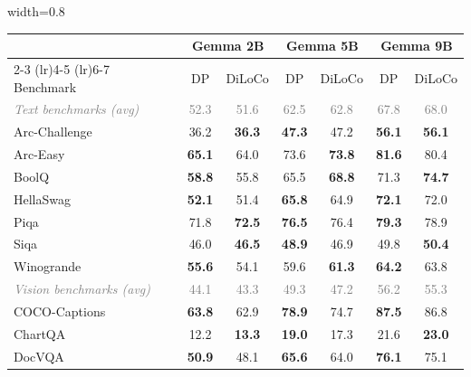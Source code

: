 \documentclass[11pt, a4paper, twocolumn, copyright, google]{google}
\begin{document}
\begin{table}[!ht]
    \centering
    \begin{adjustbox}{width=0.8\textwidth} %
    \begin{tabular}{l cc cc cc}
        \toprule
        & \multicolumn{2}{c}{Gemma 2B} & \multicolumn{2}{c}{Gemma 5B} & \multicolumn{2}{c}{Gemma 9B} \\
        \cmidrule(lr){2-3} \cmidrule(lr){4-5} \cmidrule(lr){6-7}
        Benchmark & DP & DiLoCo & DP & DiLoCo & DP & DiLoCo \\
        \midrule
        \textcolor{gray}{\small\textit{Text benchmarks (avg)}} & \textcolor{gray}{\small 52.3} & \textcolor{gray}{\small 51.6} & \textcolor{gray}{\small 62.5} & \textcolor{gray}{\small 62.8} & \textcolor{gray}{\small 67.8} & \textcolor{gray}{\small 68.0} \\
        Arc-Challenge   & 36.2 & \textbf{36.3} & \textbf{47.3} & 47.2 & \textbf{56.1} & \textbf{56.1} \\
        Arc-Easy        & \textbf{65.1} & 64.0 & 73.6 & \textbf{73.8} & \textbf{81.6} & 80.4 \\
        BoolQ           & \textbf{58.8} & 55.8 & 65.5 & \textbf{68.8} & 71.3 & \textbf{74.7} \\
        HellaSwag       & \textbf{52.1} & 51.4 & \textbf{65.8} & 64.9 & \textbf{72.1} & 72.0 \\
        Piqa            & 71.8 & \textbf{72.5} & \textbf{76.5} & 76.4 & \textbf{79.3} & 78.9 \\
        Siqa            & 46.0 & \textbf{46.5} & \textbf{48.9} & 46.9 & 49.8 & \textbf{50.4} \\
        Winogrande      & \textbf{55.6} & 54.1 & 59.6 & \textbf{61.3} & \textbf{64.2} & 63.8 \\
        \midrule
        \textcolor{gray}{\small\textit{Vision benchmarks (avg)}} & \textcolor{gray}{\small 44.1} & \textcolor{gray}{\small 43.3} & \textcolor{gray}{\small 49.3} & \textcolor{gray}{\small 47.2} & \textcolor{gray}{\small 56.2} & \textcolor{gray}{\small 55.3} \\
        COCO-Captions   & \textbf{63.8} & 62.9 & \textbf{78.9} & 74.7 & \textbf{87.5} & 86.8 \\
        ChartQA         & 12.2 & \textbf{13.3} & \textbf{19.0} & 17.3 & 21.6 & \textbf{23.0} \\
        DocVQA          & \textbf{50.9} & 48.1 & \textbf{65.6} & 64.0 & \textbf{76.1} & 75.1 \\

\end{tabular}
\end{adjustbox}
\end{table}
\end{document}
